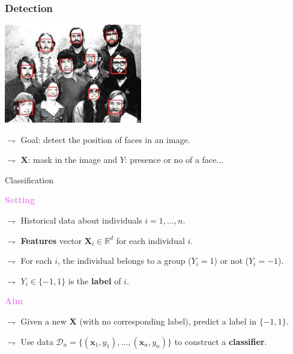 \documentclass[9pt]{beamer}
\newcommand{\R}{\mathbb{R}}
\newcommand{\vecX}{\textbf{X}}
\newcommand{\bx}{\textbf{x}}
\newcommand{\bX}{\textbf{X}}
\begin{document}
\begin{frame}
	\frametitle{Detection}
	\centerline{\includegraphics[width=6cm]{faces}}

$\rightharpoondown$  \alert{Goal}: detect the position of faces in an image.


$\rightharpoondown$  $\vecX$: mask  in the image and $Y$: presence or no of a face...


\end{frame}

\begin{frame}{Classification}

\textcolor{violet}{{\bf Setting}}

$\rightharpoondown$ Historical data  about \alert{individuals $i=1, \ldots, n$}.

$\rightharpoondown$ \textbf{Features} vector $\bX_i \in \R^d$ for each individual $i$.

$\rightharpoondown$ For each $i$, the individual \alert{belongs to a group} ($Y_i = 1$) or not ($Y_i = -1$).

$\rightharpoondown$ $Y_i \in \{ -1, 1 \}$ is  the \textbf{label} of $i$.


\vspace{.6cm}

\textcolor{violet}{{\bf Aim}}

$\rightharpoondown$ Given a new $\bX$ (with no corresponding label), \alert{predict a label in $\{ -1, 1 \}$}.

$\rightharpoondown$ Use data $\mathcal{D}_n = \{ (\bx_1, y_1), \ldots, (\bx_n, y_n) \}$ \alert{to construct a  \textbf{classifier}}.


\end{frame}
\end{document}
